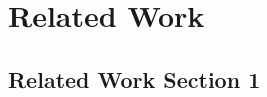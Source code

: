 %
\chapter{Related Work}
\label{sec:related}



\section{Related Work Section 1}
\label{sec:related:sec1}


